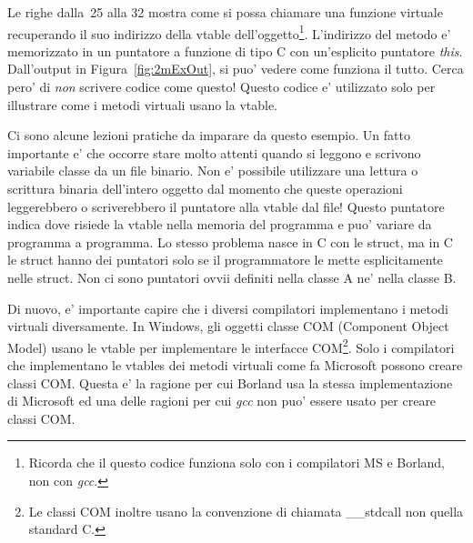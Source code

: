 Le righe dalla~25 alla 32 mostra come si possa chiamare una funzione
virtuale recuperando il suo indirizzo della vtable dell'oggetto\footnote{
Ricorda che il questo codice funziona solo con i compilatori MS e Borland,
non con \emph{gcc}.}. L'indirizzo del metodo e' memorizzato in un
puntatore a funzione di tipo C con un'esplicito puntatore \emph{this}.
Dall'output in Figura~\ref{fig:2mExOut}, si puo' vedere come funziona
il tutto. Cerca pero' di \emph{non} scrivere codice come questo! Questo
codice e' utilizzato solo per illustrare come i metodi virtuali
usano la vtable.
 

Ci sono alcune lezioni pratiche da imparare da questo esempio. Un fatto
importante e' che occorre stare molto attenti quando si leggono e 
scrivono variabile classe da un file binario. Non e' possibile
utilizzare una lettura o scrittura binaria dell'intero oggetto dal 
momento che queste operazioni leggerebbero o scriverebbero il puntatore
alla vtable dal file! Questo puntatore indica dove risiede la vtable
nella memoria del programma e puo' variare da programma a programma.
Lo stesso problema nasce in C con le struct, ma in C le struct hanno
dei puntatori solo se il programmatore le mette esplicitamente nelle
struct. Non ci sono puntatori ovvii definiti nella classe {\code A} 
ne' nella classe {\code B}.

Di nuovo, e' importante capire che i diversi compilatori implementano
i metodi virtuali diversamente. In Windows, gli oggetti classe COM
(Component Object Model) usano le vtable per implementare
le interfacce COM\footnote{Le classi COM inoltre usano la convenzione
di chiamata {\code \_\_stdcall}
non quella standard C.}. Solo i compilatori che implementano le
vtables dei metodi virtuali come fa Microsoft possono creare classi 
COM. Questa e' la ragione per cui Borland usa la stessa implementazione
di Microsoft ed una delle ragioni per cui \emph{gcc} non puo' essere
usato per creare classi COM.

